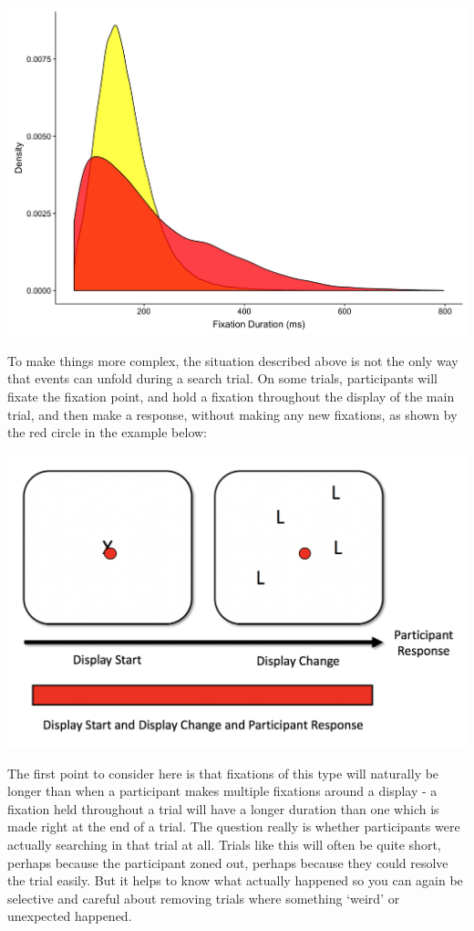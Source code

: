 \documentclass[]{book}
\begin{document}
\includegraphics[width=39.69in]{files/images/fixDurationsEyeTrackR}

To make things more complex, the situation described above is not the only way that events can unfold during a search trial. On some trials, participants will fixate the fixation point, and hold a fixation throughout the display of the main trial, and then make a response, without making any new fixations, as shown by the red circle in the example below:

\includegraphics[width=17.03in]{files/images/baseTrialSingleFix}

The first point to consider here is that fixations of this type will naturally be longer than when a participant makes multiple fixations around a display - a fixation held throughout a trial will have a longer duration than one which is made right at the end of a trial. The question really is whether participants were actually searching in that trial at all. Trials like this will often be quite short, perhaps because the participant zoned out, perhaps because they could resolve the trial easily. But it helps to know what actually happened so you can again be selective and careful about removing trials where something `weird' or unexpected happened.
\end{document}

